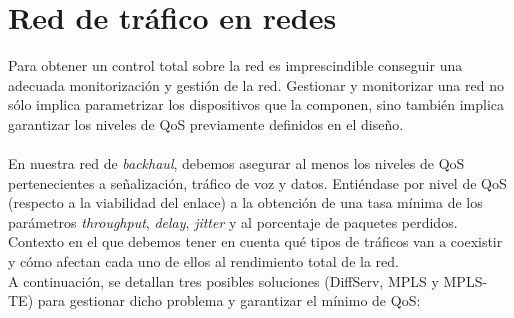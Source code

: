 \section{Red de tráfico en redes}
	Para obtener un control total sobre la red es imprescindible conseguir una adecuada monitorización y gestión de la red. Gestionar y monitorizar una red no sólo implica parametrizar los dispositivos que la componen, sino también implica garantizar los niveles de QoS previamente definidos en el diseño.\\\\
	
	En nuestra red de \textit{backhaul}, debemos asegurar al menos los niveles de QoS pertenecientes a señalización, tráfico de voz y datos. Entiéndase por nivel de QoS (respecto a la viabilidad del enlace) a la obtención de una tasa mínima de los parámetros \textit{throughput}, \textit{delay}, \textit{jitter} y al porcentaje de paquetes perdidos. Contexto en el que debemos tener en cuenta qué tipos de tráficos van a coexistir y cómo afectan cada uno de ellos al rendimiento total de la red.\\
	A continuación, se detallan tres posibles soluciones (DiffServ, MPLS y MPLS-TE) para gestionar dicho problema y garantizar el mínimo de QoS:
